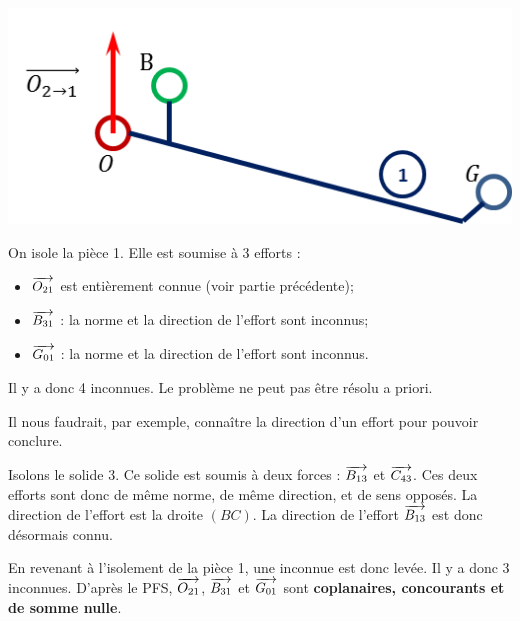 \documentclass[10pt]{article}
\begin{document}
\begin{exemple}
\begin{minipage}[c]{.3\linewidth}
\begin{center}
\includegraphics[width=.95\textwidth]{images/1_F}
\end{center}
\end{minipage}
\hfill
\begin{minipage}[c]{.65\linewidth}
On isole la pièce 1. Elle est soumise à 3 efforts : 
\begin{itemize}
\item $\overrightarrow{O_{21}}$ est entièrement connue (voir partie précédente);
\item $\overrightarrow{B_{31}}$ : la norme et la direction de l'effort sont inconnus;
\item $\overrightarrow{G_{01}}$ : la norme et la direction de l'effort sont inconnus.
\end{itemize}

Il y a donc 4 inconnues. Le problème ne peut pas être résolu a priori. 


Il nous faudrait, par exemple, connaître la direction d'un effort pour pouvoir conclure. 

Isolons le solide 3. Ce solide est soumis à deux forces : $\overrightarrow{B_{13}}$ et $\overrightarrow{C_{43}}$. Ces deux efforts sont donc de même norme, de même direction, et de sens opposés. La direction de l'effort est la droite $(BC)$. La direction de l'effort $\overrightarrow{B_{13}}$ est donc désormais connu.

En revenant à l'isolement de la pièce 1, une inconnue est donc levée. Il y a donc 3 inconnues. D'après le PFS, $\overrightarrow{O_{21}}$, $\overrightarrow{B_{31}}$ et $\overrightarrow{G_{01}}$ sont \textbf{coplanaires, concourants et de somme nulle}.

\end{minipage}
\end{exemple}
\end{document}
